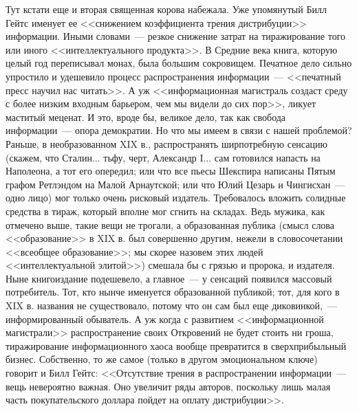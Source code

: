 \documentclass{scrbook}
\newcommand{\flqq}{<<}
\newcommand{\frqq}{>>}
\newcommand{\mdash}{~--- }
\newcommand{\commamdash}{~--- } %
\begin{document}
Тут кстати еще и вторая священная корова набежала. Уже упомянутый Билл Гейтс именует ее {\flqq}снижением коэффициента трения дистрибуции{\frqq} информации. Иными словами{\mdash}резкое снижение затрат на тиражирование того или иного {\flqq}интеллектуального продукта{\frqq}. В Средние века книга, которую целый год переписывал монах, была большим сокровищем. Печатное дело сильно упростило и удешевило процесс распространения информации{\mdash}{\flqq}печатный пресс научил нас читать{\frqq}. А уж {\flqq}информационная магистраль создаст среду с более низким входным барьером, чем мы видели до сих пор{\frqq}, ликует маститый меценат. И это, вроде бы, великое дело, так как свобода информации{\mdash}опора демократии. Но что мы имеем в связи с нашей проблемой? Раньше, в необразованном XIX в., распространять ширпотребную сенсацию (скажем, что Сталин... тьфу, черт, Александр I... сам готовился напасть на Наполеона, а тот его опередил; или что все пьесы Шекспира написаны Пятым графом Ретлэндом на Малой Арнаутской; или что Юлий Цезарь и Чингисхан{\mdash}одно лицо) мог только очень рисковый издатель. Требовалось вложить солидные средства в тираж, который вполне мог сгнить на складах. Ведь мужика, как отмечено выше, такие вещи не трогали, а образованная публика (смысл слова {\flqq}образование{\frqq} в XIX в. был совершенно другим, нежели в словосочетании {\flqq}всеобщее образование{\frqq}; мы скорее назовем этих людей {\flqq}интеллектуальной элитой{\frqq}) смешала бы с грязью и пророка, и издателя. Ныне книгоиздание подешевело, а главное{\mdash}у сенсаций появился массовый потребитель. Тот, кто нынче именуется образованной публикой; тот, для кого в XIX в. названия не существовало, потому что он сам был еще диковинкой,{\commamdash}информированный обыватель. А уж когда с развитием {\flqq}информационной магистрали{\frqq} распространение своих Откровений не будет стоить ни гроша, тиражирование информационного хаоса вообще превратится в сверхприбыльный бизнес. Собственно, то же самое (только в другом эмоциональном ключе) говорит и Билл Гейтс: {\flqq}Отсутствие трения в распространении информации{\mdash}вещь невероятно важная. Оно увеличит ряды авторов, поскольку лишь малая часть покупательского доллара пойдет на оплату дистрибуции{\frqq}.
\end{document}
